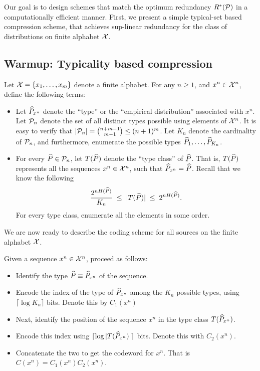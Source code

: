     Our goal is to design schemes that match the optimum redundancy $R^*(\mathcal{P})$ in a computationally efficient manner. First, we present a simple typical-set based compression scheme, that achieves sup-linear redundancy for the class of \iid distributions on finite alphabet $\mathcal{X}$. 
    
\subsection{Warmup: Typicality based compression}
\label{subsec:typicality-based-compression} 
    Let $\mathcal{X} = \{x_1, \ldots, x_m\}$ denote a finite alphabet. For any $n \geq 1$, and  $x^n \in \mathcal{X}^n$, define the following terms: 
    \begin{itemize}
        \item Let $\widehat{P}_{x^n}$ denote the ``type'' or the ``empirical distribution'' associated with $x^n$. Let $\mathcal{P}_n$ denote the set of all distinct types possible using elements of $\mathcal{X}^n$. It is easy to verify that $|\mathcal{P}_n| = {n+m-1 \choose m-1} \leq (n+1)^m$. Let $K_n$ denote the cardinality of $\mathcal{P}_n$, and furthermore, enumerate the possible types $\widehat{P}_1, \ldots, \widehat{P}_{K_n}$. 

        \item For every $\widehat{P} \in \mathcal{P}_n$, let $T(\widehat{P})$ denote the ``type class'' of $\widehat{P}$. That is, $T(\widehat{P})$ represents all the sequences $x^n \in \mathcal{X}^n$, such that $\widehat{P}_{x^n} = \widehat{P}$. Recall that we know the following 
        \begin{align}
             \frac{2^{nH(\widehat{P})}}{K_n} \;\leq\; |T(\widehat{P})| \;\leq\; 2^{n H(\widehat{P})}. 
        \end{align}
        For every type class, enumerate all the elements in some order. 
    \end{itemize}
    We are now ready to describe the coding scheme for all \iid sources on the finite alphabet $\mathcal{X}$. 
    \begin{definition}
        \label{def:universal-typical-code} 
        Given a sequence $x^n \in \mathcal{X}^n$, proceed as follows: 
        \begin{itemize}
            \item Identify the type $\widehat{P} \equiv \widehat{P}_{x^n}$ of the sequence. 
            \item Encode the index of the type of $\widehat{P}_{x^n}$ among the $K_n$ possible types, using $\lceil \log K_n \rceil$ bits. Denote this by $C_1(x^n)$ 
            \item Next, identify the position of the sequence $x^n$ in the type class $T(\widehat{P}_{x^n})$. 
            \item Encode this index using $\lceil \log |T(\widehat{P}_{x^n})| \rceil$ bits. Denote this with $C_2(x^n)$. 
            \item Concatenate the two to get the codeword for $x^n$. That is $C(x^n) = C_1(x^n) C_2(x^n)$. 
        \end{itemize}
    \end{definition}

